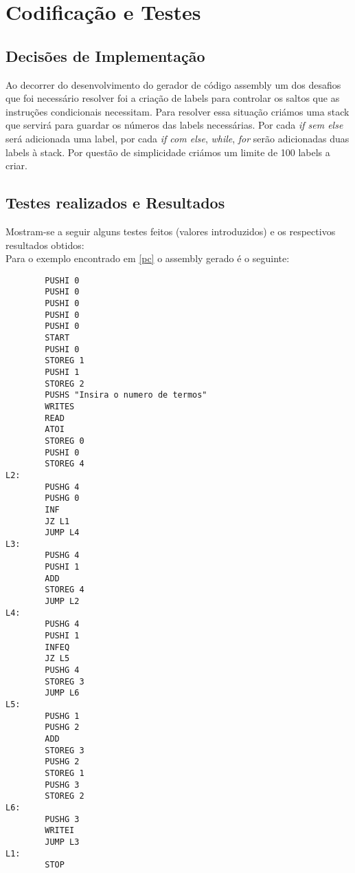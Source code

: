 \documentclass{report}
\begin{document}
\chapter{Codificação e Testes} \label {code}
\section{Decisões de Implementação}
Ao decorrer do desenvolvimento do gerador de código assembly um dos desafios que foi necessário resolver foi a criação de labels para controlar os saltos que as instruções condicionais necessitam. Para resolver essa situação criámos uma stack que servirá para guardar os números das labels necessárias. Por cada \emph{if sem else} será adicionada uma label, por cada \emph{if com else}, \emph{while}, \emph{for} serão adicionadas duas labels à stack. Por questão de simplicidade criámos um limite de 100 labels a criar.
\section{Testes realizados e Resultados}
Mostram-se a seguir alguns testes feitos (valores introduzidos) e
os respectivos resultados obtidos:\\
Para o exemplo encontrado em \ref{pc} o assembly gerado é o seguinte:
\begin{verbatim}
		PUSHI 0
        PUSHI 0
        PUSHI 0
        PUSHI 0
        PUSHI 0
        START
        PUSHI 0
        STOREG 1
        PUSHI 1
        STOREG 2
        PUSHS "Insira o numero de termos"
        WRITES
        READ
        ATOI
        STOREG 0
        PUSHI 0
        STOREG 4
L2:
        PUSHG 4
        PUSHG 0
        INF
        JZ L1
        JUMP L4
L3:
        PUSHG 4
        PUSHI 1
        ADD
        STOREG 4
        JUMP L2
L4:
        PUSHG 4
        PUSHI 1
        INFEQ
        JZ L5
        PUSHG 4
        STOREG 3
        JUMP L6
L5:
        PUSHG 1
        PUSHG 2
        ADD
        STOREG 3
        PUSHG 2
        STOREG 1
        PUSHG 3
        STOREG 2
L6:
        PUSHG 3
        WRITEI
        JUMP L3
L1:
        STOP
\end{verbatim}
\end{document}
